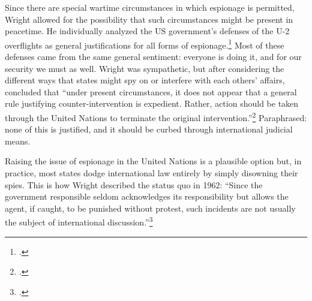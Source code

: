 \documentclass{memoir}
\begin{document}
\begin{refsegment}
Since there are special wartime circumstances in which espionage is permitted, Wright allowed for the possibility that such circumstances might be present in peacetime. He individually analyzed the US government's defenses of the U-2 overflights as general justifications for all forms of espionage.\footcite[p.~17. A fun question to ask yourself is whether putting human spies and overflights in the same category elevates the severity of human intelligence or minimizes that of overflights. I think it actually does both, and Wright seemed to agree. An overflying plane is clearly capable of greater physical destruction but ``the difference should not be exaggerated. Although a reconnaissance airplane may carry bombs, a secret agent may plant a bomb and engage in various forms of sabotage.'' (p. 21) The general lack of concern that a spy plane might be carrying bombs is consistently surprising to me. Many of these flights were in retrofitted bombers, completely indistinguishable to enemies from their heavily-armed counterparts. Nonethless, both sides seem willing to treat reconnaissance flights as their own separate thing, and that protection applies to spies as well. As long as spies \emph{don't} engage in sabotage, the fact that they have the potential to do so is irrelevant.]{wright_espionage_1962} Most of these defenses came from the same general sentiment: everyone is doing it, and for our security we must as well. Wright was sympathetic, but after considering the different ways that states might spy on or interfere with each others' affairs, concluded that ``under present circumstances, it does not appear that a general rule justifying counter-intervention is expedient. Rather, action should be taken through the United Nations to terminate the original intervention.''\footcite[p.~22]{wright_espionage_1962} Paraphrased: none of this is justified, and it should be curbed through international judicial means.


Raising the issue of espionage in the United Nations is a plausible option but, in practice, most states dodge international law entirely by simply disowning their spies. This is how Wright described the status quo in 1962: ``Since the government responsible \textelp{} seldom acknowledges its responsibility but allows the agent, if caught, to be punished without protest, such incidents are not usually the subject of international discussion.''\footcite[p.~15. As an argument for not invoking international law, I acutally find this a bit silly. Just because a bank robber never flips on their co-conspirators does not mean those co-conspirators cannot be indicted for their role in committing the crime.]{wright_espionage_1962}


\end{refsegment}
\end{document}
